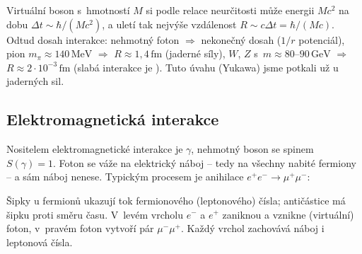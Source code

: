 \begin{vysvetleni}
  Virtuální boson s~hmotností $M$ si podle relace neurčitosti může  energii $Mc^2$ na dobu $\Delta t\sim\hbar/(Mc^2)$, a uletí tak nejvýše vzdálenost $R\sim c\Delta t = \hbar/(Mc)$. Odtud dosah interakce: nehmotný foton $\Rightarrow$ nekonečný dosah ($1/r$ potenciál), pion $m_\pi\approx140\,\mathrm{MeV}$ $\Rightarrow$ $R\approx1{,}4\,\mathrm{fm}$ (jaderné síly), $W$, $Z$ s~$m\approx80$--$90\,\mathrm{GeV}$ $\Rightarrow$ $R\approx 2\cdot10^{-3}\,\mathrm{fm}$ (slabá interakce je ). Tuto úvahu (Yukawa) jsme potkali už u jaderných sil.
\end{vysvetleni}

\subsection{Elektromagnetická interakce}

Nositelem elektromagnetické interakce je  $\gamma$, nehmotný boson se spinem $S(\gamma)=1$. Foton se váže na elektrický náboj -- tedy na všechny nabité fermiony -- a sám náboj nenese. Typickým procesem je anihilace $e^+e^-\to\mu^+\mu^-$:
\begin{center}
\end{center}
Šipky u fermionů ukazují tok fermionového (leptonového) čísla; antičástice má šipku proti směru času. V~levém vrcholu $e^-$ a $e^+$ zaniknou a vznikne (virtuální) foton, v~pravém foton vytvoří pár $\mu^-\mu^+$. Každý vrchol zachovává náboj i leptonová čísla.

